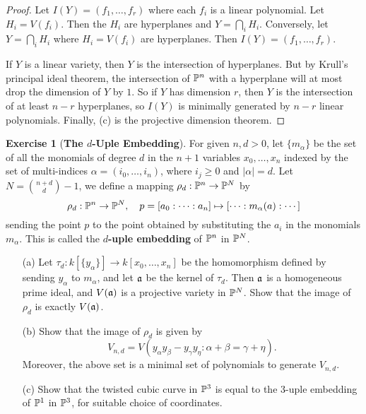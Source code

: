 \documentclass[11pt]{book}
\theoremstyle{definition}
\newtheorem{exercise}{Exercise}[section]
\begin{document}
\begin{proof}
Let $I(Y)=(f_1,\dots,f_r)$ where each $f_i$ is a linear polynomial. Let $H_i=V(f_i)$. Then the $H_i$ are hyperplanes and $Y=\bigcap_iH_i$. Conversely, let $Y=\bigcap_iH_i$ where $H_i=V(f_i)$ are hyperplanes. Then $I(Y)=(f_1,\dots,f_r)$.\par
If $Y$ is a linear variety, then $Y$ is the intersection of hyperplanes. But by Krull's principal ideal theorem, the intersection of $\P^n$ with a hyperplane will at most drop the dimension of $Y$ by $1$. So if $Y$ has dimension $r$, then $Y$ is the intersection of at least $n-r$ hyperplanes, so $I(Y)$ is minimally generated by $n-r$ linear polynomials. Finally, (c) is the projective dimension theorem.
\end{proof}
\begin{exercise}[\textbf{The $d$-Uple Embedding}]\label{d-uple embedding}
For given $n,d>0$, let $\{m_\alpha\}$ be the set of all the monomials of degree $d$ in the $n+1$ variables $x_0,\dots,x_n$ indexed by the set of multi-indices $\alpha=(i_0,\dots,i_n)$, where $i_j\geq 0$ and $|\alpha|=d$. Let $N=\binom{n+d}{d}-1$, we define a mapping $\rho_d:\P^n\to\P^N$ by
\[\rho_d:\P^n\to\P^N,\quad p=[a_0:\cdots:a_n]\mapsto[\dots:m_\alpha(a):\cdots]\]
sending the point $p$ to the point obtained by substituting the $a_i$ in the monomials $m_\alpha$. This is called the \textbf{$d$-uple embedding} of $\P^n$ in $\P^N$.
\begin{itemize}
\item[(a)] Let $\tau_d:k[\{y_\alpha\}]\to k[x_0,\dots,x_n]$ be the homomorphism defined by sending $y_\alpha$ to $m_\alpha$, and let $\a$ be the kernel of $\tau_d$. Then $\a$ is a homogeneous prime ideal, and $V(\a)$ is a projective variety in $\P^N$. Show that the image of $\rho_d$ is exactly $V(\a)$. 
\item[(b)] Show that the image of $\rho_d$ is given by
\[V_{n,d}=V(y_\alpha y_\beta-y_\gamma y_\eta:\alpha+\beta=\gamma+\eta).\]
Moreover, the above set is a minimal set of polynomials to generate $V_{n,d}$.
\item[(c)] Show that the twisted cubic curve in $\P^3$ is equal to the $3$-uple embedding of $\P^1$ in $\P^3$, for suitable choice of coordinates.
\end{itemize}
\end{exercise}
\end{document}

